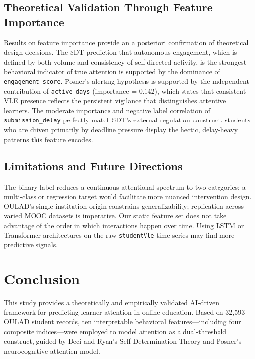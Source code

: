 \documentclass[conference]{IEEEtran}
\begin{document}
\subsection{Theoretical Validation Through Feature Importance}

Results on feature importance provide an a posteriori confirmation of theoretical design decisions. The SDT prediction that autonomous engagement, which is defined by both volume and consistency of self-directed activity, is the strongest behavioral indicator of true attention is supported by the dominance of \texttt{engagement\_score}. Posner's alerting hypothesis is supported by the independent contribution of \texttt{active\_days} (importance = 0.142), which states that consistent VLE presence reflects the persistent vigilance that distinguishes attentive learners. The moderate importance and negative label correlation of \texttt{submission\_delay} perfectly match SDT's external regulation construct: students who are driven primarily by deadline pressure display the hectic, delay-heavy patterns this feature encodes.

\subsection{Limitations and Future Directions}

The binary label reduces a continuous attentional spectrum to two categories; a multi-class or regression target would facilitate more nuanced intervention design. OULAD's single-institution origin constrains generalizability; replication across varied MOOC datasets is imperative. Our static feature set does not take advantage of the order in which interactions happen over time. Using LSTM or Transformer architectures on the raw \texttt{studentVle} time-series may find more predictive signals.

\section{Conclusion}
\label{sec:conclusion}
This study provides a theoretically and empirically validated AI-driven framework for predicting learner attention in online education. Based on 32,593 OULAD student records, ten interpretable behavioral features—including four composite indices—were employed to model attention as a dual-threshold construct, guided by Deci and Ryan's Self-Determination Theory and Posner's neurocognitive attention model.
\end{document}

